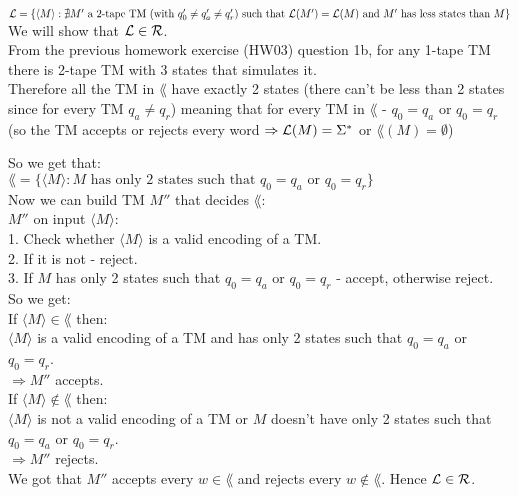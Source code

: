 $\mathcal{L} = \{\langle M \rangle : \nexists M' \text{ a 2-tape TM } (\text{with } q'_0 \neq q'_a \neq q'_r) \text{ such that } \\
    \mathcal{L}(M')=\mathcal{L}(M) \text{ and } M' \text{ has less states than } M\}$ \\

We will show that $\mathcal{L} \in \mathcal{R}$. \\

From the previous homework exercise (HW03) question 1b, for any 1-tape TM there is 2-tape TM with 3 states that simulates it. \\
Therefore all the TM in $\lang$ have exactly 2 states (there can't be less than 2 states since for every TM $q_a \neq q_r$)
meaning that for every TM in $\lang$ - $q_0 = q_a$ or $q_0 = q_r$ (so the TM accepts or rejects every word
$\Rightarrow \mathcal{L}(M) = \Sigma^*$ or $\lang(M) = \emptyset$)

So we get that: \\
$\lang = \{\langle M \rangle : M \text{ has only 2 states such that } q_0 = q_a \text{ or }q_0 = q_r\}$ \\

Now we can build TM $M''$ that decides $\lang$: \\
$M''$ on input $\langle M \rangle$: \\
1. Check whether $\langle M \rangle$ is a valid encoding of a TM. \\
2. If it is not - reject. \\
3. If $M$ has only 2 states such that $q_0 = q_a$ or $q_0 = q_r$ - accept, otherwise reject. \\

So we get: \\
If $\langle M \rangle \in \lang$ then: \\
$\langle M \rangle$ is a valid encoding of a TM and has only 2 states such that $q_0 = q_a$ or $q_0 = q_r$. \\
$\Longrightarrow M''$ accepts. \\

If $\langle M \rangle \notin \lang$ then: \\
$\langle M \rangle$ is not a valid encoding of a TM or $M$ doesn't have only 2 states such that $q_0 = q_a$ or $q_0 = q_r$. \\
$\Longrightarrow M''$ rejects. \\

We got that $M''$ accepts every $w \in \lang$ and rejects every $w \notin \lang$. Hence $\mathcal{L} \in \mathcal{R}$. \\
